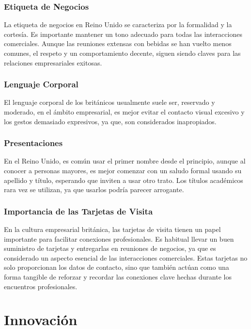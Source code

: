 \documentclass[letterpaper, 12pt]{article}
\begin{document}
\subsubsection*{Etiqueta de Negocios}

La etiqueta de negocios en Reino Unido se caracteriza por la formalidad y la
cortesía. Es importante mantener un tono adecuado para todas las interacciones
comerciales. Aunque las reuniones extensas con bebidas se han vuelto menos
comunes, el respeto y un comportamiento decente, siguen siendo claves para las
relaciones empresariales exitosas.

\subsubsection*{Lenguaje Corporal}

El lenguaje corporal de los británicos usualmente suele ser, reservado y
moderado, en el ámbito empresarial, es mejor evitar el contacto visual excesivo
y los gestos demasiado expresivos, ya que, son considerados inapropiados.

\subsubsection*{Presentaciones}

En el Reino Unido, es común usar el primer nombre desde el principio, aunque al
conocer a personas mayores, es mejor comenzar con un saludo formal usando su
apellido y título, esperando que inviten a usar otro trato. Los títulos
académicos rara vez se utilizan, ya que usarlos podría parecer arrogante.

\subsubsection*{Importancia de las Tarjetas de Visita}

En la cultura empresarial británica, las tarjetas de visita tienen un papel
importante para facilitar conexiones profesionales. Es habitual llevar un buen
suministro de tarjetas y entregarlas en reuniones de negocios, ya que es
considerado un aspecto esencial de las interacciones comerciales. Estas
tarjetas no solo proporcionan los datos de contacto, sino que también actúan
como una forma tangible de reforzar y recordar las conexiones clave hechas
durante los encuentros profesionales.

\section*{Innovación}
\end{document}
